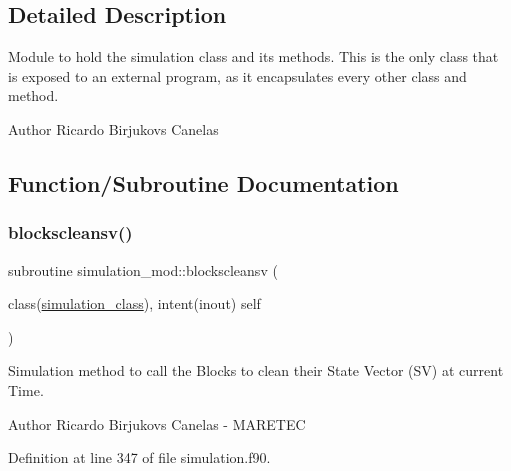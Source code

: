 \subsection{Detailed Description}
Module to hold the simulation class and its methods. This is the only class that is exposed to an external program, as it encapsulates every other class and method. 

\begin{DoxyAuthor}{Author}
Ricardo Birjukovs Canelas 
\end{DoxyAuthor}


\subsection{Function/\+Subroutine Documentation}
\mbox{\label{namespacesimulation__mod_a4cec8fb4baf1b2f69cd2699b0c5b9a55}} 
\subsubsection{\texorpdfstring{blockscleansv()}{blockscleansv()}}
{\footnotesize\ttfamily subroutine simulation\+\_\+mod\+::blockscleansv (\begin{DoxyParamCaption}\item[{class(\mbox{\hyperlink{structsimulation__mod_1_1simulation__class}{simulation\+\_\+class}}), intent(inout)}]{self }\end{DoxyParamCaption})\hspace{0.3cm}{\ttfamily [private]}}



Simulation method to call the Blocks to clean their State Vector (SV) at current Time. 

\begin{DoxyAuthor}{Author}
Ricardo Birjukovs Canelas -\/ M\+A\+R\+E\+T\+EC 
\end{DoxyAuthor}


Definition at line 347 of file simulation.\+f90.


\mbox{\label{namespacesimulation__mod_a8390f0a56ff2678d144af1dd09517a5e}} 
